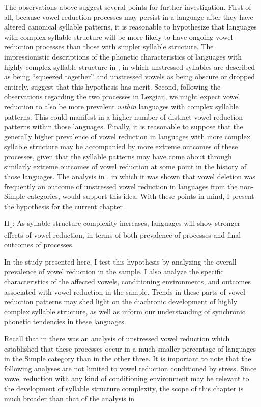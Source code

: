   The observations above suggest several points for further investigation. First of all, because vowel reduction processes may persist in a language after they have altered canonical syllable patterns, it is reasonable to hypothesize that languages with complex syllable structure will be more likely to have ongoing vowel reduction processes than those with simpler syllable structure. The impressionistic descriptions of the phonetic characteristics of languages with highly complex syllable structure in , in which unstressed syllables are described as being “squeezed together” and unstressed vowels as being obscure or dropped entirely, suggest that this hypothesis has merit. Second, following the observations regarding the two processes in Lezgian, we might expect vowel reduction to also be more prevalent \textit{within} languages with complex syllable patterns. This could manifest in a higher number of distinct vowel reduction patterns within those languages. Finally, it is reasonable to suppose that the generally higher prevalence of vowel reduction in languages with more complex syllable structure may be accompanied by more extreme outcomes of these processes, given that the syllable patterns may have come about through similarly extreme outcomes of vowel reduction at some point in the history of those languages. The analysis in , in which it was shown that vowel deletion was frequently an outcome of unstressed vowel reduction in languages from the non-Simple categories, would support this idea. With these points in mind, I present the hypothesis for the current chapter .

\ea\label{ex:(6.3)}
   H\textsubscript{1}:  As syllable structure complexity increases, languages will show stronger effects of vowel reduction, in terms of both prevalence of processes and final outcomes of processes.

\z

  In the study presented here, I test this hypothesis by analyzing the overall prevalence of vowel reduction in the sample. I also analyze the specific characteristics of the affected vowels, conditioning environments, and outcomes associated with vowel reduction in the sample. Trends in these parts of vowel reduction patterns may shed light on the diachronic development of highly complex syllable structure, as well as inform our understanding of synchronic phonetic tendencies in these languages.

  Recall that in  there was an analysis of unstressed vowel reduction which established that these processes occur in a much smaller percentage of languages in the Simple category than in the other three. It is important to note that the following analyses are not limited to vowel reduction conditioned by stress. Since vowel reduction with any kind of conditioning environment may be relevant to the development of syllable structure complexity, the scope of this chapter is much broader than that of the analysis in 

